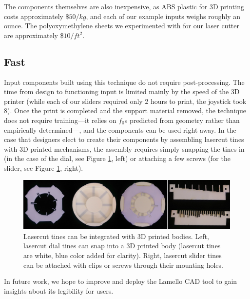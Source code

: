     The components themselves are also inexpensive, as ABS plastic for 3D printing costs approximately \$$50/kg$, and each of our example inputs weighs roughly an ounce. The polyoxymethylene sheets we experimented with for our laser cutter are approximately \$$10/ft^2$.
    
    \subsection{Fast}
    Input components built using this technique do not require post-processing. The time from design to functioning input is limited mainly by the speed of the 3D printer (while each of our sliders required only 2 hours to print, the joystick took 8). Once the print is completed and the support material removed, the technique does not require training---it relies on $f_0$s predicted from geometry rather than empirically determined---, and the components can be used right away. In the case that designers elect to create their components by assembling lasercut tines with 3D printed mechanisms, the assembly requires simply snapping the tines in (in the case of the dial, see Figure \ref{fig:lamello-laser}, left) or attaching a few screws (for the slider, see Figure \ref{fig:lamello-laser}, right).
    
\begin{figure}
  \centering
    \includegraphics[width=\textwidth]{figures/lamello/lamello-laser.png}
  \caption{Lasercut tines can be integrated with 3D printed bodies. Left, lasercut dial tines can snap into a 3D printed body (lasercut tines are white, blue color added for clarity). Right, lasercut slider tines can be attached with clips or screws through their mounting holes.} 
  \label{fig:lamello-laser}
\end{figure}
    
    In future work, we hope to improve and deploy the Lamello CAD tool to gain insights about its legibility for users.

